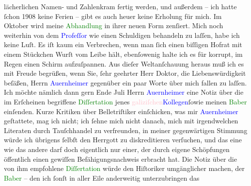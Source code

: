                     lächerlichen Namen- und Zahlenkram fertig werden, und außerdem – ich hatte ſchon
                        1908 keine Ferien – gibt es auch heuer keine Erholung für mich.
                    Im Oktober wird meine \textcolor{green}{Abhandlung}{} in ihrer neuen Form zenſiert. Mich noch
                    weiterhin von dem \textcolor{blue}{Profeſſor}{} wie einen Schuldigen behandeln zu laſſen, habe ich keine
                    Luſt. Es iſt kaum ein Verbrechen, wenn man ſich einen biſſigen Hofrat mit einem
                    Stückchen Wurſt vom Leibe hält, ebenſowenig halte ich es für korrupt, im Regen
                    einen Schirm aufzuſpannen. Aus dieſer Weltanſchauung heraus muß ich es mit
                    Freude begrüßen, wenn Sie, ſehr geehrter Herr Doktor, die Liebenswürdigkeit
                    beſäßen, Herrn \textcolor{blue}{Auernheimer}{}\ledrightnote{\textcolor{blue}{Raoul Auernheimer}} gegenüber ein
                    paar Worte über mich fallen zu laſſen. Ich möchte nämlich dann gern Ende
                        Juli Herrn \textcolor{blue}{Auernheimer}{}\ledrightnote{\textcolor{blue}{Raoul Auernheimer}} eine Notiz
                    über die im Erſcheinen begriffene \textcolor{green}{Diſſertation}{} jenes \textcolor{pink}{galiziſchen}{}\ledrightnote{\textcolor{pink}{Galizien}}{ }\textcolor{blue}{Kollegen}{}ſowie meinen \textcolor{green}{Baber}{}\ledrightnote{\textcolor{green}{Tod des Zehir eddin Muhammed Baber}} einſenden. Kurze Kritiken über Belletriſtiker
                    einſchicken, was mir \textcolor{blue}{Auernheimer}{}\ledrightnote{\textcolor{blue}{Raoul Auernheimer}} geſtattete,
                    mag ich nicht; ich ſehne mich nicht danach, mich mit irgendwelchen Literaten
                    durch Tauſchhandel zu verfreunden, in meiner gegenwärtigen Stimmung würde ich
                    übrigens ſelbſt den Herrgott zu diskreditieren verſuchen, und das eine wie das
                    andere darf doch eigentlich nur einer, der durch eigene Schöpfungen öffentlich
                    einen gewiſſen Befähigungsnachweis erbracht hat. Die Notiz über die von ihm
                    empfohlene \textcolor{green}{Diſſertation}{}
                    würde den Hiſtoriker umgänglicher machen, der \textcolor{green}{Baber}{}\ledrightnote{\textcolor{green}{Tod des Zehir eddin Muhammed Baber}} – den ich ſonſt in aller Eile anderweitig unterzubringen das
